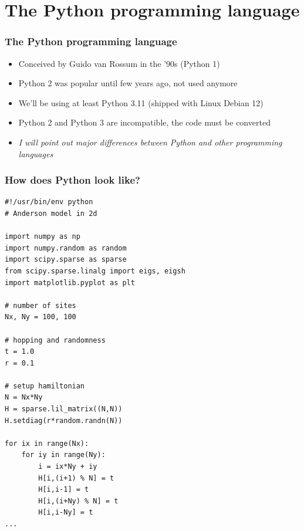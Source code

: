 \documentclass[handout]{beamer}
\begin{document}
\section{The Python programming language}
\begin{frame}[fragile]
  \frametitle{The Python programming language}
  \begin{itemize}
  \item Conceived by Guido van Rossum in the '90s (Python 1)
  \item Python 2 was popular until few years ago, not used anymore
  \item We'll be using at least Python 3.11 (shipped with Linux Debian 12)
  \item Python 2 and Python 3 are incompatible, the code must be converted
  \item \emph{I will point out major differences between Python and other programming languages}
  \end{itemize}
\end{frame}

\begin{frame}[fragile]
  \frametitle{How does Python look like?}
  \lstset{language=Python,basicstyle=\tiny\ttfamily,keywordstyle=\color{blue}, stringstyle=\color{green},numberstyle=\color{red}]}
  \begin{lstlisting}
#!/usr/bin/env python
# Anderson model in 2d

import numpy as np
import numpy.random as random
import scipy.sparse as sparse
from scipy.sparse.linalg import eigs, eigsh
import matplotlib.pyplot as plt

# number of sites
Nx, Ny = 100, 100

# hopping and randomness
t = 1.0
r = 0.1

# setup hamiltonian
N = Nx*Ny
H = sparse.lil_matrix((N,N))
H.setdiag(r*random.randn(N))

for ix in range(Nx):
    for iy in range(Ny):
        i = ix*Ny + iy
        H[i,(i+1) % N] = t
        H[i,i-1] = t
        H[i,(i+Ny) % N] = t
        H[i,i-Ny] = t
...
  \end{lstlisting}
\end{frame}
\end{document}
